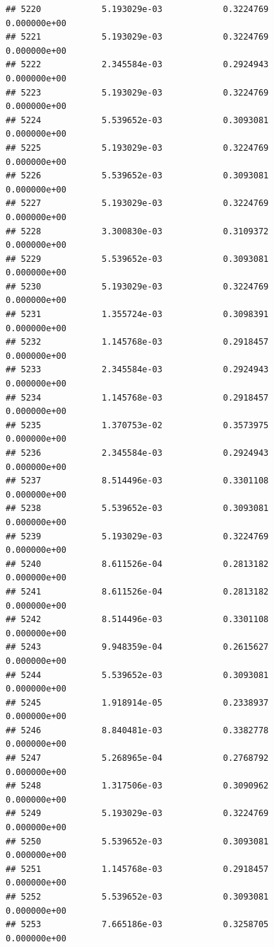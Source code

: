 \documentclass[
]{article}
\begin{document}
\begin{verbatim}
## 5220            5.193029e-03            0.3224769            0.000000e+00
## 5221            5.193029e-03            0.3224769            0.000000e+00
## 5222            2.345584e-03            0.2924943            0.000000e+00
## 5223            5.193029e-03            0.3224769            0.000000e+00
## 5224            5.539652e-03            0.3093081            0.000000e+00
## 5225            5.193029e-03            0.3224769            0.000000e+00
## 5226            5.539652e-03            0.3093081            0.000000e+00
## 5227            5.193029e-03            0.3224769            0.000000e+00
## 5228            3.300830e-03            0.3109372            0.000000e+00
## 5229            5.539652e-03            0.3093081            0.000000e+00
## 5230            5.193029e-03            0.3224769            0.000000e+00
## 5231            1.355724e-03            0.3098391            0.000000e+00
## 5232            1.145768e-03            0.2918457            0.000000e+00
## 5233            2.345584e-03            0.2924943            0.000000e+00
## 5234            1.145768e-03            0.2918457            0.000000e+00
## 5235            1.370753e-02            0.3573975            0.000000e+00
## 5236            2.345584e-03            0.2924943            0.000000e+00
## 5237            8.514496e-03            0.3301108            0.000000e+00
## 5238            5.539652e-03            0.3093081            0.000000e+00
## 5239            5.193029e-03            0.3224769            0.000000e+00
## 5240            8.611526e-04            0.2813182            0.000000e+00
## 5241            8.611526e-04            0.2813182            0.000000e+00
## 5242            8.514496e-03            0.3301108            0.000000e+00
## 5243            9.948359e-04            0.2615627            0.000000e+00
## 5244            5.539652e-03            0.3093081            0.000000e+00
## 5245            1.918914e-05            0.2338937            0.000000e+00
## 5246            8.840481e-03            0.3382778            0.000000e+00
## 5247            5.268965e-04            0.2768792            0.000000e+00
## 5248            1.317506e-03            0.3090962            0.000000e+00
## 5249            5.193029e-03            0.3224769            0.000000e+00
## 5250            5.539652e-03            0.3093081            0.000000e+00
## 5251            1.145768e-03            0.2918457            0.000000e+00
## 5252            5.539652e-03            0.3093081            0.000000e+00
## 5253            7.665186e-03            0.3258705            0.000000e+00

\end{verbatim}
\end{document}
